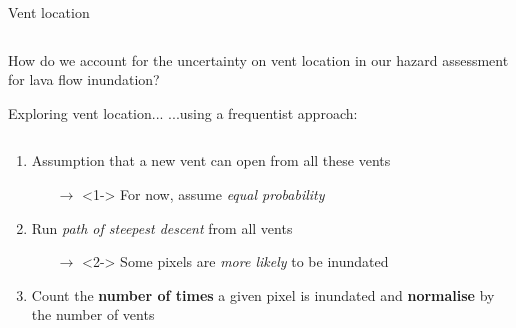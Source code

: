 \documentclass[10pt,aspectratio=169]{beamer}
\begin{document}
\begin{frame}{Vent location}
\begin{columns}[T]
{\begin{column}{0.5\textwidth}
      \end{column}
      }
    \end{columns}
 \end{frame}

\begin{frame}[standout]
  How do we account for the \alert{uncertainty on vent location} in our hazard assessment for lava flow inundation?
\end{frame}

\begin{frame}[t]{Exploring vent location...}
  ...using a frequentist approach:
  \begin{columns}[T]
    \begin{column}{0.5\textwidth}
      
      \begin{enumerate}
        \item<1- | alert@1> Assumption that a new vent can open from all these vents
        \begin{itemize}
          \item[$\rightarrow$]<1-> For now, assume \textit{equal probability}
        \end{itemize}
        \item<2- | alert@2> Run \textit{path of steepest descent} from all vents
        \begin{itemize}
          \item[$\rightarrow$]<2-> Some pixels are \textit{more likely} to be inundated
        \end{itemize}
        \item<3- | alert@3> Count the \textbf{number of times} a given pixel is inundated and \textbf{normalise} by the number of vents
      \end{enumerate}

    \end{column}


\end{columns}
\end{frame}
\end{document}
